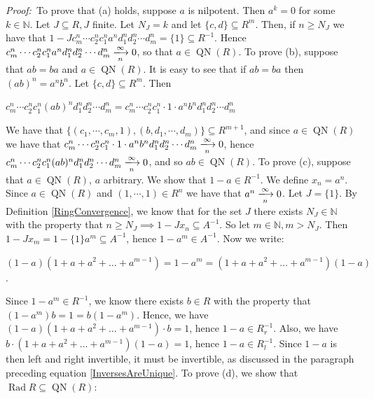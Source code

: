 \documentclass[12pt, oneside]{book}
\newcommand{\proof}{{\noindent \it Proof:~}}
\def\Rad{\operatorname{Rad}}
\def\QN{\operatorname{QN}}
\begin{document}
\proof \space To prove that (a) holds, suppose $a$ is nilpotent. Then $a^k=0$ for some 
$k \in \mathbb{N}$.
Let $J \subseteq R, J$ finite. Let $N_J = k$ and let $\{c,d\} \subseteq R^m$. Then, if $n \geqslant N_J$ 
we have that $1-J c^n_m \cdots c^n_2c^n_1a^nd^n_1d^n_2 \cdots d^n_m = \{1\} \subseteq R^{-1}$. 
Hence $c^n_m \cdots c^n_2c^n_1a^nd^n_1d^n_2 \cdots d^n_m \xlongrightarrow[n]{\infty} 0$, 
so that $a \in \QN(R)$.
\vskip 0.3cm
\noindent To prove (b), suppose that $ab=ba$ and $a \in \QN(R)$. It is easy to see that if $ab = ba$ 
then $(ab)^n = a^n b^n$. Let $\{c,d\} \subseteq R^m$. Then 
\begin{center}
$c_m^n \cdots c_2^nc_1^n(ab)^nd_1^nd_2^n \cdots d_m^n = c_m^n \cdots c_2^nc_1^n \cdot 1 \cdot a^n b^nd_1^nd_2^n \cdots d_m^n$
\end{center}
\noindent We have that $\{(c_1, \cdots, c_m, 1), (b, d_1, \cdots, d_m)\} \subseteq R^{m+1}$, 
and since $a \in \QN(R)$ we have that 
$c_m^n \cdots c_2^nc_1^n \cdot 1 \cdot a^n b^nd_1^nd_2^n \cdots d_m^n\xlongrightarrow[n]{\infty} 0$, 
hence $c_m^n \cdots c_2^nc_1^n(ab)^nd_1^nd_2^n \cdots d_m^n \xlongrightarrow[n]{\infty} 0$, 
and so $ab \in \QN(R)$.
\vskip 0.3cm
\noindent To prove (c), suppose that $a \in \QN(R)$, $a$ arbitrary. We show that $1-a \in R^{-1}$. 
We define $x_n = a^n$. Since $a \in \QN(R)$ and $(1, \cdots, 1) \in R^n$ 
we have that $a^n \xlongrightarrow[n]{\infty}0$. Let $J = \{1 \}$. By Definition \ref{RingConvergence}, 
we know that for the set $J$ there exists $N_J \in \mathbb{N}$ with the property that 
$n \geqslant N_J \implies 1 - Jx_n \subseteq A^{-1}$. So let $m \in \mathbb{N}, m > N_J$. 
Then $1 - Jx_m = 1 - \{1\}a^m \subseteq A^{-1}$, hence $1 - a^m \in A^{-1}$. Now we write:
\begin{center}
$(1-a)(1+a+a^2+ \dots + a^{m-1})=1-a^m=(1+a+a^2+ \dots + a^{m-1})(1-a)$.
\end{center}
Since $1 - a^m \in R^{-1}$, we know there exists $b \in R$ with the property that
$ (1 - a^m)b = 1 = b(1 - a^m)$. Hence, we have $(1-a)(1+a+a^2+ \dots + a^{m-1}) \cdot b = 1$, 
hence $1 - a \in R^{-1}_r$. Also, we have  $b \cdot (1+a+a^2+ \dots + a^{m-1})(1-a) = 1$, 
hence $1 - a \in R^{-1}_l$. Since $1 - a$ is then left and right invertible, it must be invertible, 
as discussed in the paragraph preceding equation \eqref{InversesAreUnique}.
\vskip 0.3cm
\noindent To prove (d), we show that $\Rad R \subseteq \QN(R)$:
\end{document}

